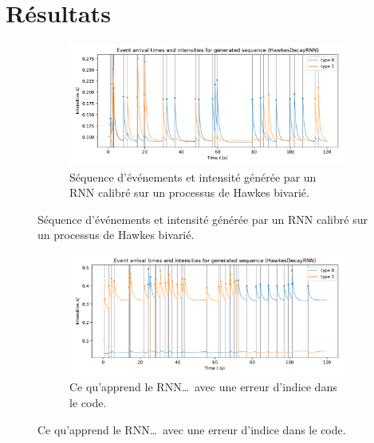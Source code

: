 \documentclass{beamer}
\begin{document}
\section{Résultats}

\begin{frame}
\begin{figure}
	\begin{subfigure}{\linewidth}
	\includegraphics[width=\linewidth]{../results/intensity_HawkesDecayRNN_2d_hidden128_20181209-132014.pdf}
	\caption{Séquence d'événements et intensité générée par un RNN calibré sur un processus de Hawkes bivarié.}
	\end{subfigure}
\end{figure}
\end{frame}

\begin{frame}
\begin{figure}\ContinuedFloat
	\begin{subfigure}{\linewidth}
		\includegraphics[width=\linewidth]{../results/intensity_HawkesDecayRNN_2d_hidden64_20181209-003122_OLD.pdf}
		\caption{Ce qu'apprend le RNN\ldots~avec une erreur d'indice dans le code.}
	\end{subfigure}
\end{figure}
\end{frame}
\end{document}
